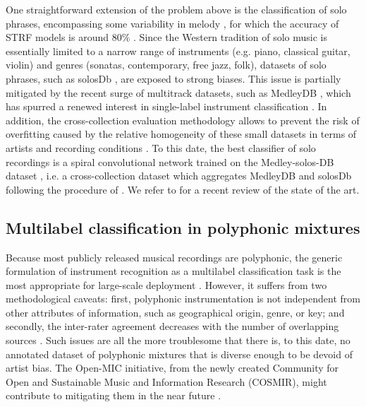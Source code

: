 \documentclass{article}
\makeatletter
\newcommand*{\eg}{e.g.\@\xspace}
\newcommand*{\ie}{i.e.\@\xspace}
\makeatother
\begin{document}
One straightforward extension of the problem above is the classification of solo phrases, encompassing some variability in melody \cite{krishna2004icassp}, for which the accuracy of STRF models is around $80\%$ \cite{patil2015eurasip}.
Since the Western tradition of solo music is essentially limited to a narrow range of instruments (\eg{} piano, classical guitar, violin) and genres (sonatas, contemporary, free jazz, folk), datasets of solo phrases, such as solosDb \cite{joder2009taslp}, are exposed to strong biases.
This issue is partially mitigated by the recent surge of multitrack datasets, such as MedleyDB \cite{bittner2014ismir}, which has spurred a renewed interest in single-label instrument classification \cite{yip2017ismir}.
In addition, the cross-collection evaluation methodology \cite{livshin2003ismir} allows to prevent the risk of overfitting caused by the relative homogeneity of these small datasets in terms of artists and recording conditions \cite{bogdanov2016ismir}.
To this date, the best classifier of solo recordings is a spiral convolutional network \cite{lostanlen2016ismir} trained on the Medley-solos-DB dataset \cite{lostanlen2018msdb}, \ie{} a cross-collection dataset which aggregates MedleyDB and solosDb following the procedure of \cite{donnelly2015icdmw}.
We refer to \cite{han2017taslp} for a recent review of the state of the art.

\subsection{Multilabel classification in polyphonic mixtures}
Because most publicly released musical recordings are polyphonic, the generic formulation of instrument recognition as a multilabel classification task is the most appropriate for large-scale deployment \cite{martins2007ismir,burred2009icassp}.
However, it suffers from two methodological caveats: first, polyphonic instrumentation is not independent from other attributes of information, such as geographical origin, genre, or key; and secondly, the inter-rater agreement decreases with the number of overlapping sources \cite[chapter 6]{fuhrmann2012phd}.
Such issues are all the more troublesome that there is, to this date, no  annotated dataset of polyphonic mixtures that is diverse enough to be devoid of artist bias.
The Open-MIC initiative, from the newly created Community for Open and Sustainable Music and Information Research (COSMIR), might contribute to mitigating them in the near future \cite{mcfee2016ismir}.
\end{document}
